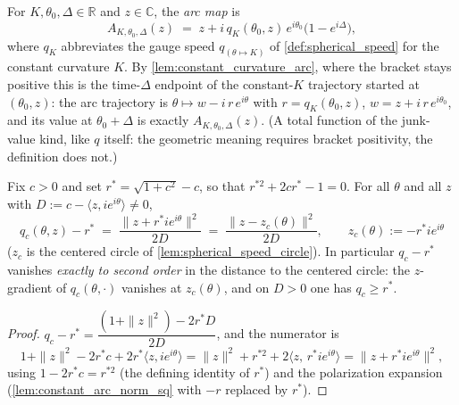\begin{definition}
  \label{def:spherical_arc_map}
  For $K,\theta_0,\Delta\in\mathbb R$ and $z\in\mathbb C$, the \emph{arc map} is
  \[
    A_{K,\theta_0,\Delta}(z)\;=\;z+i\,q_K(\theta_0,z)\,e^{i\theta_0}\bigl(1-e^{i\Delta}\bigr),
  \]
  where $q_K$ abbreviates the gauge speed $q_{(\theta\mapsto K)}$ of
  \cref{def:spherical_speed} for the constant curvature $K$. By
  \cref{lem:constant_curvature_arc}, where the bracket stays positive this is the
  time-$\Delta$ endpoint of the constant-$K$ trajectory started at $(\theta_0,z)$: the
  arc trajectory is $\theta\mapsto w-i\,r\,e^{i\theta}$ with $r=q_K(\theta_0,z)$,
  $w=z+i\,r\,e^{i\theta_0}$, and its value at $\theta_0+\Delta$ is exactly
  $A_{K,\theta_0,\Delta}(z)$. (A total function of the junk-value kind, like $q$ itself:
  the geometric meaning requires bracket positivity, the definition does not.)
\end{definition}

\begin{lemma}
  \label{lem:speed_quadratic_identity}
  Fix $c>0$ and set $r^\ast=\sqrt{1+c^2}-c$, so that $r^{\ast2}+2cr^\ast-1=0$. For all
  $\theta$ and all $z$ with $D:=c-\langle z,ie^{i\theta}\rangle\ne0$,
  \[
    q_c(\theta,z)-r^\ast\;=\;\frac{\bigl\|z+r^\ast i e^{i\theta}\bigr\|^2}{2D}
    \;=\;\frac{\|z-z_c(\theta)\|^2}{2D},
    \qquad z_c(\theta):=-r^\ast i e^{i\theta}
  \]
  ($z_c$ is the centered circle of \cref{lem:spherical_speed_circle}). In particular
  $q_c-r^\ast$ vanishes \emph{exactly to second order} in the distance to the centered
  circle: the $z$-gradient of $q_c(\theta,\cdot)$ vanishes at $z_c(\theta)$, and on
  $D>0$ one has $q_c\ge r^\ast$.
\end{lemma}

\begin{proof}
  \leanok
  $q_c-r^\ast=\dfrac{(1+\|z\|^2)-2r^\ast D}{2D}$, and the numerator is
  \[
    1+\|z\|^2-2r^\ast c+2r^\ast\langle z,ie^{i\theta}\rangle
    =\|z\|^2+r^{\ast2}+2\langle z,\,r^\ast ie^{i\theta}\rangle
    =\|z+r^\ast ie^{i\theta}\|^2,
  \]
  using $1-2r^\ast c=r^{\ast2}$ (the defining identity of $r^\ast$) and the polarization
  expansion (\cref{lem:constant_arc_norm_sq} with $-r$ replaced by $r^\ast$).
\end{proof}

